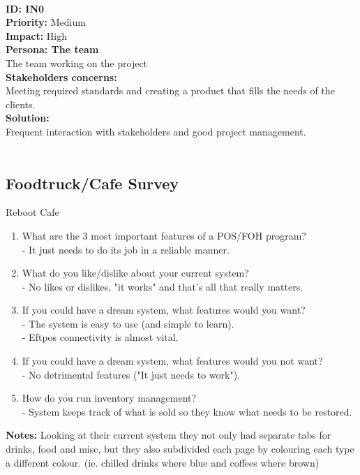 \\
\textbf{ID: IN0}\\
\textbf{Priority:} Medium\\
\textbf{Impact:} High\\
\textbf{Persona: The team\\}
The team working on the project\\
\textbf{Stakeholders concerns:\\}
Meeting required standards and creating a product that fills the needs of the clients.\\
\textbf{Solution:\\}
Frequent interaction with stakeholders and good project management.\\
\\
\subsection{Foodtruck/Cafe Survey}
{\large Reboot Cafe \par}
\begin{enumerate}
	\item What are the 3 most important features of a POS/FOH program?\\
	 - It just needs to do its job in a reliable manner.
	\item What do you like/dislike about your current system?\\
	 - No likes or dislikes, "it works" and that's all that really matters.
	\item If you could have a dream system, what features would you want?\\
	 - The system is easy to use (and simple to learn).\\
	 - Eftpos connectivity is almost vital.
	\item If you could have a dream system, what features would you not want?\\
	 - No detrimental features ("It just needs to work").
	\item How do you run inventory management?\\
	 - System keeps track of what is sold so they know what needs to be restored.
\end{enumerate}
\textbf{Notes:}
Looking at their current system they not only had separate tabs for drinks, food and misc, but they also subdivided each page by colouring each type a different colour. (ie. chilled drinks where blue and coffees where brown)\\\\\\
